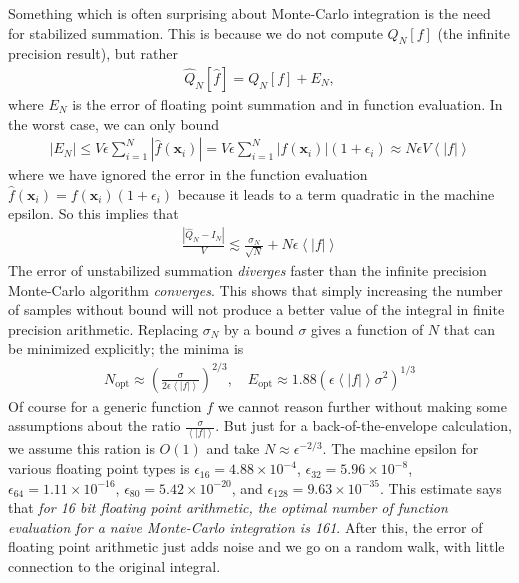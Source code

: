 \documentclass[landscape]{article}
\numberwithin{equation}{section}
\begin{document}
Something which is often surprising about Monte-Carlo integration is the need for stabilized summation.
This is because we do not compute $Q_{N}[f]$ (the infinite precision result), but rather
\begin{align*}
\hat{Q}_{N}[\hat{f}] = Q_{N}[f] + E_{N},
\end{align*}
where $E_{N}$ is the error of floating point summation and in function evaluation.
In the worst case, we can only bound
\begin{align*}
|E_{N}| \le V\epsilon \sum_{i=1}^{N} |\hat{f}(\mathbf{x}_{i})|  = V\epsilon \sum_{i=1}^{N} |f(\mathbf{x}_{i})|(1+\epsilon_{i}) \approx N\epsilon V \left< |f|\right>
\end{align*}
where we have ignored the error in the function evaluation $\hat{f}(\mathbf{x}_{i}) = f(\mathbf{x}_{i})(1+\epsilon_{i})$ because it leads to a term quadratic in the machine epsilon.
So this implies that
\begin{align*}
\frac{\left| \hat{Q}_{N}  - I_{N} \right|}{V}  \lesssim  \frac{\sigma_{N}}{\sqrt{N}} + N\epsilon \left< |f| \right>
\end{align*}
The error of unstabilized summation \emph{diverges} faster than the infinite precision Monte-Carlo algorithm \emph{converges}.
This shows that simply increasing the number of samples without bound will not produce a better value of the integral in finite precision arithmetic.
Replacing $\sigma_{N}$ by a bound $\sigma$ gives a function of $N$ that can be minimized explicitly; the minima is
\begin{align*}
N_{\mathrm{opt}} \approx \left( \frac{\sigma}{2\epsilon \left< |f|\right>} \right)^{2/3}, \quad E_{\mathrm{opt}} \approx 1.88(\epsilon\left<|f|\right>\sigma^2)^{1/3}
\end{align*}
Of course for a generic function $f$ we cannot reason further without making some assumptions about the ratio $\frac{\sigma}{\left<|f|\right>}$.
But just for a back-of-the-envelope calculation, we assume this ration is $O(1)$ and take $N \approx \epsilon^{-2/3}$.
The machine epsilon for various floating point types is $\epsilon_{16} = 4.88\times 10^{-4}$, $\epsilon_{32} = 5.96\times 10^{-8}$, $\epsilon_{64} = 1.11\times 10^{-16}$, $\epsilon_{80} = 5.42\times 10^{-20}$, and $\epsilon_{128} = 9.63\times 10^{-35}$.
This estimate says that \emph{for 16 bit floating point arithmetic, the optimal number of function evaluation for a naive Monte-Carlo integration is 161}.
After this, the error of floating point arithmetic just adds noise and we go on a random walk, with little connection to the original integral.
\end{document}
